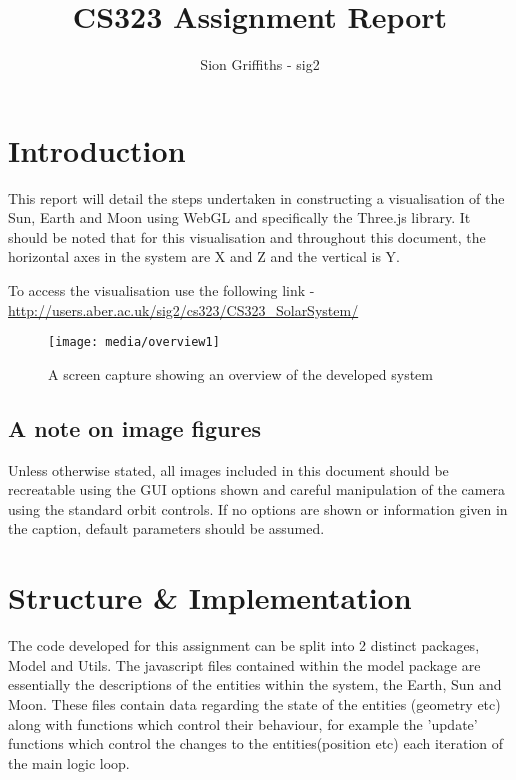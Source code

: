 \documentclass[titlepage]{article}
\title{CS323 Assignment Report}
\author{Sion Griffiths - sig2}
\begin{document}
\maketitle
\tableofcontents




\newpage
\section{Introduction}

This report will detail the steps undertaken in constructing a visualisation of the Sun, Earth and Moon using WebGL and specifically the Three.js library. It should be noted that for this visualisation and throughout this document, the horizontal axes in the system are X and Z and the vertical is Y.

To access the visualisation use the following link -  \url{http://users.aber.ac.uk/sig2/cs323/CS323\_SolarSystem/}


\begin{figure}[h!]
                \centering
                \texttt{[image: media/overview1]}
                \caption{A screen capture showing an overview of the developed system}
                \label{fig:basic_model}
            \end{figure}


\subsection{A note on image figures}
Unless otherwise stated, all images included in this document should be recreatable using the GUI options shown and careful manipulation of the camera using the standard orbit controls. If no options are shown or information given in the caption, default parameters should be assumed.
\section{Structure \& Implementation}
The code developed for this assignment can be split into 2 distinct packages, Model and Utils. The javascript files contained within the model package are essentially the descriptions of the entities within the system, the Earth, Sun and Moon. These files contain data regarding the state of the entities (geometry etc) along with functions which control their behaviour, for example the 'update' functions which control the changes to the entities(position etc) each iteration of the main logic loop.
\end{document}
